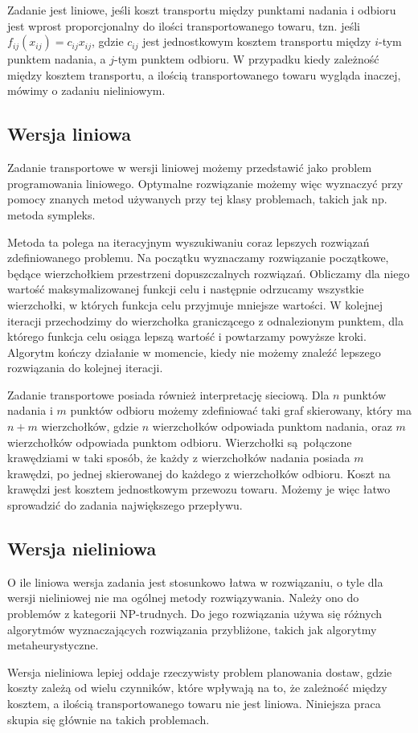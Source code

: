 Zadanie jest liniowe, jeśli koszt transportu między punktami nadania i odbioru jest wprost proporcjonalny 
do ilości transportowanego towaru, tzn. jeśli $f_{ij}(x_{ij}) = c_{ij} x_{ij}$, gdzie $c_{ij}$ jest jednostkowym kosztem transportu 
między $i$-tym punktem nadania, a $j$-tym punktem odbioru. W przypadku kiedy zależność między kosztem transportu, a ilością transportowanego 
towaru wygląda inaczej, mówimy o zadaniu nieliniowym.

\subsection{Wersja liniowa}
Zadanie transportowe w wersji liniowej możemy przedstawić jako problem programowania liniowego. Optymalne rozwiązanie możemy więc wyznaczyć 
przy pomocy znanych metod używanych przy tej klasy problemach, takich jak np. metoda sympleks\cite{TP-SYMPLEX-BOOK}. 

Metoda ta polega na 
iteracyjnym wyszukiwaniu coraz lepszych rozwiązań zdefiniowanego problemu. Na początku wyznaczamy rozwiązanie początkowe, będące wierzchołkiem 
przestrzeni dopuszczalnych rozwiązań. Obliczamy dla niego wartość maksymalizowanej funkcji celu i następnie odrzucamy wszystkie 
wierzchołki, w których funkcja celu przyjmuje mniejsze wartości. W kolejnej iteracji przechodzimy do wierzchołka graniczącego z odnalezionym 
punktem, dla którego funkcja celu osiąga lepszą wartość i powtarzamy powyższe kroki. Algorytm kończy działanie w momencie, kiedy nie możemy 
znaleźć lepszego rozwiązania do kolejnej iteracji.

Zadanie transportowe posiada również interpretację sieciową. Dla $n$ punktów nadania i $m$ punktów odbioru możemy zdefiniować taki graf 
skierowany, który ma $n + m$ wierzchołków, gdzie $n$ wierzchołków odpowiada punktom nadania, oraz $m$ wierzchołków odpowiada punktom odbioru.
Wierzchołki są połączone krawędziami w taki sposób, że każdy z wierzchołków nadania posiada $m$ krawędzi, po jednej skierowanej do 
każdego z wierzchołków odbioru. Koszt na krawędzi jest kosztem jednostkowym przewozu towaru. Możemy je więc łatwo sprowadzić do zadania 
największego przepływu\cite{MAX-FLOW-ALG}. 

\subsection{Wersja nieliniowa}
O ile liniowa wersja zadania jest stosunkowo łatwa w rozwiązaniu, o tyle dla wersji nieliniowej nie ma ogólnej metody rozwiązywania. Należy 
ono do problemów z kategorii NP-trudnych\cite{Guisewite1990, NONLINEAR-NP-HARD}. Do jego rozwiązania używa się różnych algorytmów wyznaczających 
rozwiązania przybliżone, takich jak algorytmy metaheurystyczne. 

Wersja nieliniowa lepiej oddaje rzeczywisty problem planowania dostaw, gdzie koszty zależą od wielu czynników, które wpływają na to, 
że zależność między kosztem, a ilością transportowanego towaru nie jest liniowa. Niniejsza praca skupia się głównie na takich problemach.
